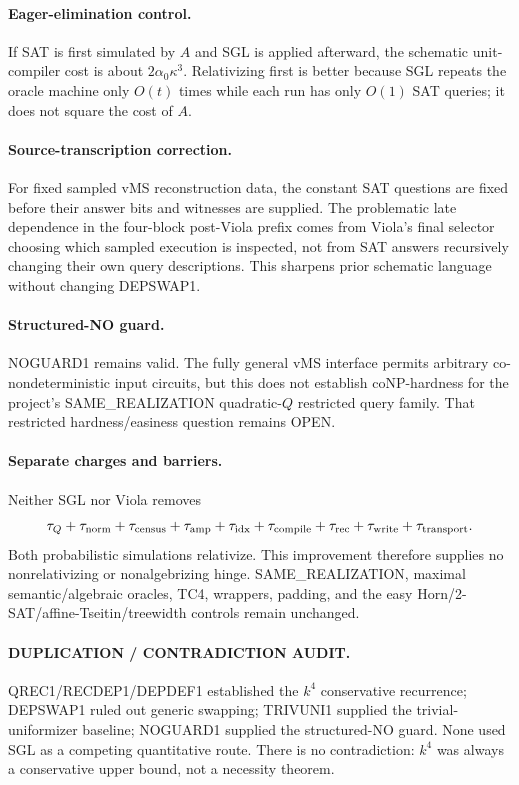 \documentclass[11pt]{article}
\begin{document}
\paragraph{Eager-elimination control.}
If SAT is first simulated by $A$ and SGL is applied afterward, the schematic unit-compiler cost is about $2\alpha_0\kappa^3$. Relativizing first is better because SGL repeats the oracle machine only $O(t)$ times while each run has only $O(1)$ SAT queries; it does not square the cost of $A$.

\paragraph{Source-transcription correction.}
For fixed sampled vMS reconstruction data, the constant SAT questions are fixed before their answer bits and witnesses are supplied. The problematic late dependence in the four-block post-Viola prefix comes from Viola's final selector choosing which sampled execution is inspected, not from SAT answers recursively changing their own query descriptions. This sharpens prior schematic language without changing DEPSWAP1.

\paragraph{Structured-NO guard.}
NOGUARD1 remains valid. The fully general vMS interface permits arbitrary co-nondeterministic input circuits, but this does not establish coNP-hardness for the project's SAME\_REALIZATION quadratic-$Q$ restricted query family. That restricted hardness/easiness question remains OPEN.

\paragraph{Separate charges and barriers.}
Neither SGL nor Viola removes
\[
\tau_Q+\tau_{\rm norm}+\tau_{\rm census}+\tau_{\rm amp}
+\tau_{\rm idx}+\tau_{\rm compile}+\tau_{\rm rec}
+\tau_{\rm write}+\tau_{\rm transport}.
\]
Both probabilistic simulations relativize. This improvement therefore supplies no nonrelativizing or nonalgebrizing hinge. SAME\_REALIZATION, maximal semantic/algebraic oracles, TC4, wrappers, padding, and the easy Horn/2-SAT/affine-Tseitin/treewidth controls remain unchanged.

\paragraph{DUPLICATION / CONTRADICTION AUDIT.}
QREC1/RECDEP1/DEPDEF1 established the $k^4$ conservative recurrence; DEPSWAP1 ruled out generic swapping; TRIVUNI1 supplied the trivial-uniformizer baseline; NOGUARD1 supplied the structured-NO guard. None used SGL as a competing quantitative route. There is no contradiction: $k^4$ was always a conservative upper bound, not a necessity theorem.
\end{document}
